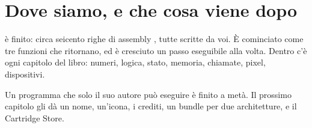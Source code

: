 \section{Dove siamo, e che cosa viene dopo}

\vermone è finito: circa seicento righe di assembly \riscv, tutte scritte da
voi. È cominciato come tre funzioni che ritornano, ed è cresciuto un passo
eseguibile alla volta. Dentro c'è ogni capitolo del libro: numeri, logica,
stato, memoria, chiamate, pixel, dispositivi.

Un programma che solo il suo autore può eseguire è finito a metà. Il prossimo
capitolo gli dà un nome, un'icona, i crediti, un bundle per due architetture,
e il Cartridge Store.
